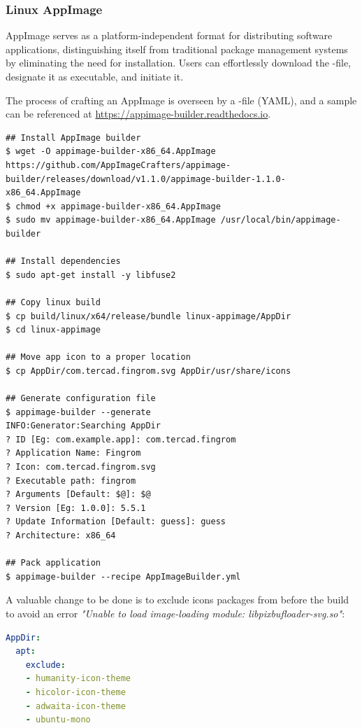 \subsubsection{Linux AppImage}

AppImage serves as a platform-independent format for distributing software applications, distinguishing itself from
traditional package management systems by eliminating the need for installation. Users can effortlessly download the
-file, designate it as executable, and initiate it.

The process of crafting an AppImage is overseen by a -file (YAML), and a sample can be referenced at
\href{https://appimage-builder.readthedocs.io}{https://appimage-builder.readthedocs.io}.

\begin{lstlisting}[language=terminal]
## Install AppImage builder
$ wget -O appimage-builder-x86_64.AppImage https://github.com/AppImageCrafters/appimage-builder/releases/download/v1.1.0/appimage-builder-1.1.0-x86_64.AppImage
$ chmod +x appimage-builder-x86_64.AppImage
$ sudo mv appimage-builder-x86_64.AppImage /usr/local/bin/appimage-builder

## Install dependencies
$ sudo apt-get install -y libfuse2

## Copy linux build
$ cp build/linux/x64/release/bundle linux-appimage/AppDir
$ cd linux-appimage

## Move app icon to a proper location
$ cp AppDir/com.tercad.fingrom.svg AppDir/usr/share/icons

## Generate configuration file
$ appimage-builder --generate
INFO:Generator:Searching AppDir
? ID [Eg: com.example.app]: com.tercad.fingrom
? Application Name: Fingrom
? Icon: com.tercad.fingrom.svg
? Executable path: fingrom
? Arguments [Default: $@]: $@
? Version [Eg: 1.0.0]: 5.5.1
? Update Information [Default: guess]: guess
? Architecture: x86_64

## Pack application
$ appimage-builder --recipe AppImageBuilder.yml
\end{lstlisting}

\noindent A valuable change  to be done is to exclude icons packages from  before
the build to avoid an error \emph{"Unable to load image-loading module: libpixbufloader-svg.so"}:

\begin{lstlisting}[language=yaml]
AppDir:
  apt:
    exclude:
    - humanity-icon-theme
    - hicolor-icon-theme
    - adwaita-icon-theme
    - ubuntu-mono
\end{lstlisting}


